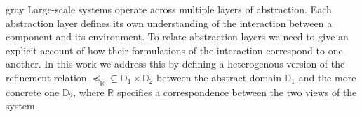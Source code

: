 \documentclass[sigplan,10pt,review]{acmart}
\newcommand{\refby}{\preceq}
\newenvironment{optional}{\begin{color}{gray}}{\end{color}}
\begin{document}
\begin{optional}
Large-scale systems operate across multiple layers of abstraction.
Each abstraction layer defines its own understanding of the interaction
between a component and its environment.
To relate abstraction layers we need to give
an explicit account of how their formulations of the interaction
correspond to one another.
In this work we address this by defining a heterogenous version
of the refinement relation
${\refby_\mathbb{R}} \subseteq
 \mathbb{D}_1 \times \mathbb{D}_2$ between
the abstract domain $\mathbb{D}_1$ and
the more concrete one $\mathbb{D}_2$, where
$\mathbb{R}$ specifies a correspondence between
the two views of the system.



%
%
%

\end{optional}
\end{document}

